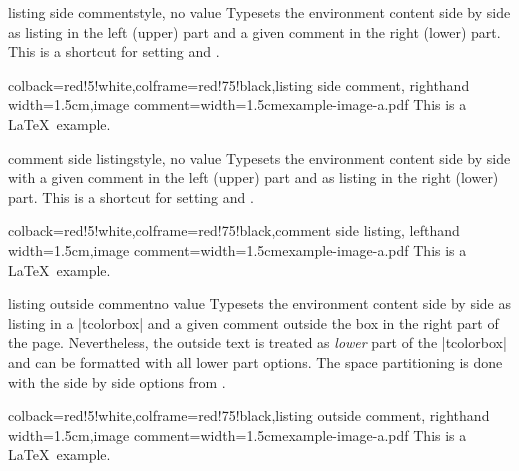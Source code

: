 \begin{docTcbKey}{listing side comment}{}{style, no value}
Typesets the environment content side by side as listing in the left (upper)
part and a given comment in the right (lower) part.
This is a shortcut for setting  and .
\begin{dispExample}
\begin{tcblisting}{colback=red!5!white,colframe=red!75!black,listing side comment,
  righthand width=1.5cm,image comment={width=1.5cm}{example-image-a.pdf}}
This is a \LaTeX\ example.
\end{tcblisting}
\end{dispExample}
\end{docTcbKey}


\begin{docTcbKey}{comment side listing}{}{style, no value}
Typesets the environment content side by side with a given comment in the left (upper)
part and as listing in the right (lower) part.
This is a shortcut for setting  and .
\begin{dispExample}
\begin{tcblisting}{colback=red!5!white,colframe=red!75!black,comment side listing,
  lefthand width=1.5cm,image comment={width=1.5cm}{example-image-a.pdf}}
This is a \LaTeX\ example.
\end{tcblisting}
\end{dispExample}
\end{docTcbKey}

\clearpage

\begin{docTcbKey}{listing outside comment}{}{no value}
Typesets the environment content side by side as listing in a |tcolorbox|
and a given comment outside the box in the right part of the page.
Nevertheless, the outside text is treated as \emph{lower} part of the
|tcolorbox| and can be formatted with all lower part options.
The space partitioning is done with the side by side options from
.
\begin{dispExample}
\begin{tcblisting}{colback=red!5!white,colframe=red!75!black,listing outside comment,
  righthand width=1.5cm,image comment={width=1.5cm}{example-image-a.pdf}}
This is a \LaTeX\ example.
\end{tcblisting}
\end{dispExample}
\end{docTcbKey}


